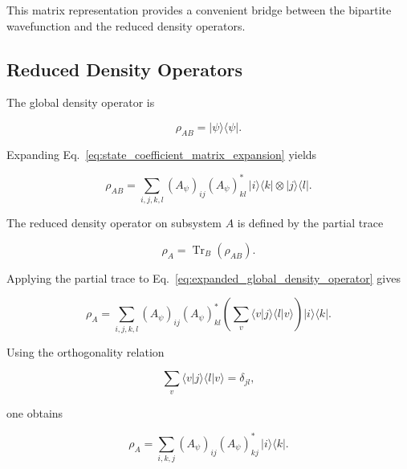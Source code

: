 This matrix representation provides a convenient bridge between the bipartite wavefunction and the reduced density operators.


\subsection*{Reduced Density Operators}

The global density operator is

\begin{equation}
\rho_{AB}
=
|\psi\rangle\langle\psi|.
\label{eq:global_density_operator_appendix}
\end{equation}

Expanding Eq.~\eqref{eq:state_coefficient_matrix_expansion} yields

\begin{equation}
\rho_{AB}
=
\sum_{i,j,k,l}
(A_\psi)_{ij}
(A_\psi)^*_{kl}
\,
|i\rangle\langle k|
\otimes
|j\rangle\langle l|.
\label{eq:expanded_global_density_operator}
\end{equation}

The reduced density operator on subsystem \(A\) is defined by the partial trace

\begin{equation}
\rho_A
=
\operatorname{Tr}_B(\rho_{AB}).
\label{eq:partial_trace_appendix}
\end{equation}

Applying the partial trace to Eq.~\eqref{eq:expanded_global_density_operator} gives

\begin{equation}
\rho_A
=
\sum_{i,j,k,l}
(A_\psi)_{ij}
(A_\psi)^*_{kl}
\left(
\sum_v
\langle v|j\rangle
\langle l|v\rangle
\right)
|i\rangle\langle k|.
\label{eq:partial_trace_expansion}
\end{equation}

Using the orthogonality relation

\begin{equation}
\sum_v
\langle v|j\rangle
\langle l|v\rangle
=
\delta_{jl},
\label{eq:orthogonality_relation_appendix}
\end{equation}

one obtains

\begin{equation}
\rho_A
=
\sum_{i,k,j}
(A_\psi)_{ij}
(A_\psi)^*_{kj}
\,|i\rangle\langle k|.
\label{eq:reduced_density_operator_expanded}
\end{equation}


